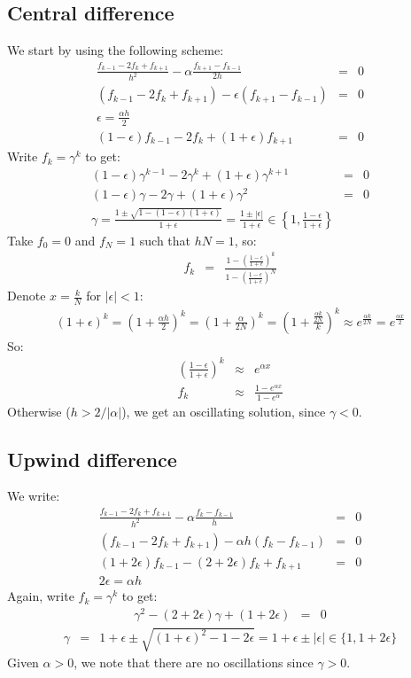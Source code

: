 \documentclass[11pt]{article}
\newcommand\eps \epsilon
\begin{document}
\subsection{Central difference}
We start by using the following scheme:
\begin{eqnarray}
  \frac{f_{k-1}-2f_k+f_{k+1}}{h^2}
  - \alpha \frac{f_{k+1}-f_{k-1}}{2h} &=& 0 \\
(f_{k-1}-2f_k+f_{k+1}) - \eps (f_{k+1}-f_{k-1}) &=& 0 \\
\eps = \frac{\alpha h}{2} \\
(1-\eps)f_{k-1}-2f_k+(1+\eps)f_{k+1} &=& 0
\end{eqnarray}
Write $f_k = \gamma^k$ to get:
\begin{eqnarray}
  (1-\eps)\gamma^{k-1} - 2\gamma^k + (1+\eps)\gamma^{k+1}&=& 0 \\
  (1-\eps)\gamma - 2\gamma + (1+\eps)\gamma^2&=& 0 \\
  \gamma = \frac{1 \pm \sqrt{1 - (1-\eps)(1+\eps)}}{1+\eps}
         = \frac{1 \pm |\eps|}{1+\eps} \in
           \left\{1, \frac{1- \eps}{1+\eps}\right\}
\end{eqnarray}
Take $f_0 = 0$ and $f_N = 1$ such that $h N = 1$, so:
\begin{eqnarray}
  f_k &=& \frac{1 - \left(\frac{1- \eps}{1+\eps}\right)^k}
  {1 - \left(\frac{1- \eps}{1+\eps}\right)^N}
\end{eqnarray}
Denote $x = \frac{k}{N}$ for $|\eps| < 1$:
\begin{eqnarray}
(1+\eps)^k = \left(1+\frac{\alpha h}{2}\right)^k =
\left(1+\frac{\alpha}{2N}\right)^k =
\left(1+\frac{\frac{\alpha k}{2N}}{k}\right)^k \approx
e^{\frac{\alpha k}{2N}} = e^{\frac{\alpha x}{2}}
\end{eqnarray}
So:
\begin{eqnarray}
  \left(\frac{1- \eps}{1+\eps}\right)^k &\approx& e^{\alpha x} \\
  f_k &\approx& \frac{1 - e^{\alpha x}}{1 - e^{\alpha}}
\end{eqnarray}
Otherwise ($h > 2/|\alpha|$), we get an oscillating solution, since $\gamma < 0$.
\subsection{Upwind difference}
We write:
\begin{eqnarray}
\frac{f_{k-1}-2f_k+f_{k+1}}{h^2} - \alpha \frac{f_k - f_{k-1}}{h} &=& 0 \\
(f_{k-1}-2f_k+f_{k+1}) - \alpha h (f_k - f_{k-1}) &=& 0 \\
(1 + 2\eps)f_{k-1}- (2 + 2\eps)f_k + f_{k+1} &=& 0 \\
2\eps = \alpha h
\end{eqnarray}
Again, write $f_k = \gamma^k$ to get:
\begin{eqnarray}
 \gamma^2 - (2 + 2\eps) \gamma + (1 + 2\eps) &=& 0
\end{eqnarray}
\begin{eqnarray}
\gamma &=& 1+\eps \pm \sqrt{(1+\eps)^2 - 1 - 2\eps} = 1 + \eps \pm |\eps| \in \{1, 1+2\eps\}
\end{eqnarray}
Given $\alpha > 0$, we note that there are no oscillations since $\gamma > 0$.
\end{document}
